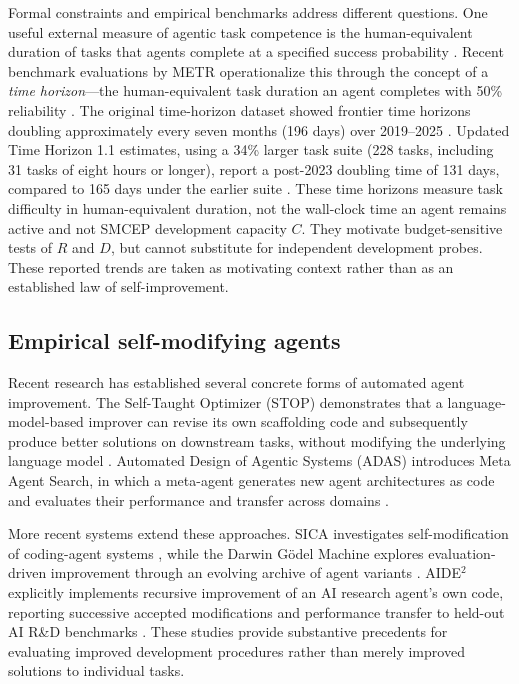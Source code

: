 \documentclass[11pt,a4paper]{article}
\begin{document}
Formal constraints and empirical benchmarks address different questions. One useful external measure of agentic task competence is the human-equivalent duration of tasks that agents complete at a specified success probability \cite{metr2025measuring}. Recent benchmark evaluations by METR operationalize this through the concept of a \emph{time horizon}---the human-equivalent task duration an agent completes with 50\% reliability \cite{metr2025measuring,metr2026timehorizon}. The original time-horizon dataset showed frontier time horizons doubling approximately every seven months (196 days) over 2019--2025 \cite{metr2025measuring,metr2026timehorizon}. Updated Time Horizon 1.1 estimates, using a 34\% larger task suite (228 tasks, including 31 tasks of eight hours or longer), report a post-2023 doubling time of 131 days, compared to 165 days under the earlier suite \cite{metr2026timehorizon}. These time horizons measure task difficulty in human-equivalent duration, not the wall-clock time an agent remains active and not SMCEP development capacity $C$. They motivate budget-sensitive tests of $R$ and $D$, but cannot substitute for independent development probes. These reported trends are taken as motivating context rather than as an established law of self-improvement.

\subsection{Empirical self-modifying agents}
Recent research has established several concrete forms of automated agent improvement. The Self-Taught Optimizer (STOP) demonstrates that a language-model-based improver can revise its own scaffolding code and subsequently produce better solutions on downstream tasks, without modifying the underlying language model \cite{zelikman2024stop}. Automated Design of Agentic Systems (ADAS) introduces Meta Agent Search, in which a meta-agent generates new agent architectures as code and evaluates their performance and transfer across domains \cite{hu2024adas}.

More recent systems extend these approaches. SICA investigates self-modification of coding-agent systems
\cite{robeyns2025}, while the Darwin G\"odel Machine explores evaluation-driven improvement through an
evolving archive of agent variants \cite{zhang2026}. AIDE$^2$ explicitly implements recursive improvement of an AI research agent's own code, reporting successive accepted modifications and performance transfer to held-out AI R\&D benchmarks \cite{srikanth2026}. These studies provide substantive precedents for evaluating improved development procedures rather than merely improved solutions to individual tasks.
\end{document}
